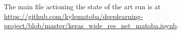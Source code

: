 \documentclass[10pt,twocolumn,letterpaper]{article}
\begin{document}
	The main file actioning the state of the art run is at \url{https://github.com/kylematoba/deeplearning-project/blob/master/keras_wide_res_net_matoba.ipynb}.


\nocite{Torralba2008}
{\small


}
\end{document}
